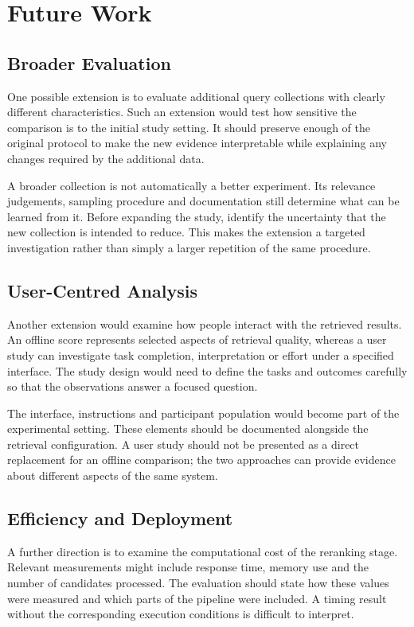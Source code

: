 \chapter{Future Work}
\label{sec:future_work}

\section{Broader Evaluation}
One possible extension is to evaluate additional query collections with clearly
different characteristics. Such an extension would test how sensitive the
comparison is to the initial study setting. It should preserve enough of the
original protocol to make the new evidence interpretable while explaining
any changes required by the additional data.

A broader collection is not automatically a better experiment. Its relevance
judgements, sampling procedure and documentation still determine what can be
learned from it. Before expanding the study, identify the uncertainty that the
new collection is intended to reduce. This makes the extension a targeted
investigation rather than simply a larger repetition of the same procedure.

\section{User-Centred Analysis}
Another extension would examine how people interact with the retrieved results.
An offline score represents selected aspects of retrieval quality, whereas
a user study can investigate task completion, interpretation or effort under
a specified interface. The study design would need to define the tasks and
outcomes carefully so that the observations answer a focused question.

The interface, instructions and participant population would become part of
the experimental setting. These elements should be documented alongside the
retrieval configuration. A user study should not be presented as a direct
replacement for an offline comparison; the two approaches can provide evidence
about different aspects of the same system.

\newpage
\section{Efficiency and Deployment}
A further direction is to examine the computational cost of the reranking
stage. Relevant measurements might include response time, memory use and the
number of candidates processed. The evaluation should state how these values
were measured and which parts of the pipeline were included. A timing result
without the corresponding execution conditions is difficult to interpret.

